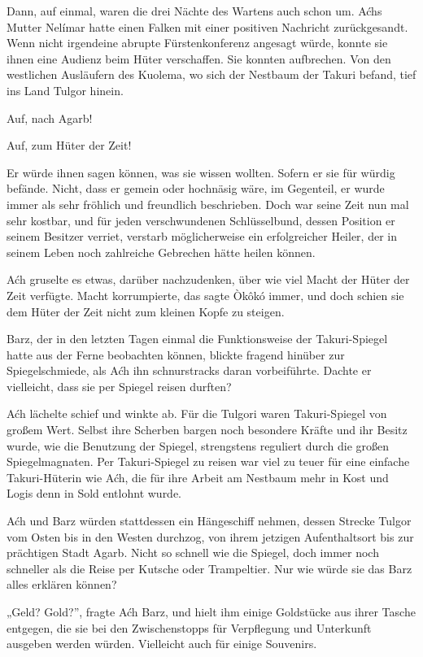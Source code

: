 \trennzeichen



Dann, auf einmal, waren die drei Nächte des Wartens auch schon um. Aćhs Mutter Nelímar hatte einen Falken mit einer positiven Nachricht zurückgesandt. Wenn nicht irgendeine abrupte Fürstenkonferenz angesagt würde, konnte sie ihnen eine Audienz beim Hüter verschaffen. Sie konnten aufbrechen. Von den westlichen Ausläufern des Kuolema, wo sich der Nestbaum der Takuri befand, tief ins Land Tulgor hinein.

Auf, nach Agarb!

Auf, zum Hüter der Zeit!

Er würde ihnen sagen können, was sie wissen wollten. Sofern er sie für würdig befände. Nicht, dass er gemein oder hochnäsig wäre, im Gegenteil, er wurde immer als sehr fröhlich und freundlich beschrieben. Doch war seine Zeit nun mal sehr kostbar, und für jeden verschwundenen Schlüsselbund, dessen Position er seinem Besitzer verriet, verstarb möglicherweise ein erfolgreicher Heiler, der in seinem Leben noch zahlreiche Gebrechen hätte heilen können.

Aćh gruselte es etwas, darüber nachzudenken, über wie viel Macht der Hüter der Zeit verfügte. Macht korrumpierte, das sagte Òkôkó immer, und doch schien sie dem Hüter der Zeit nicht zum kleinen Kopfe zu steigen.

Barz, der in den letzten Tagen einmal die Funktionsweise der Takuri-Spiegel hatte aus der Ferne beobachten können, blickte fragend hinüber zur Spiegelschmiede, als Aćh ihn schnurstracks daran vorbeiführte. Dachte er vielleicht, dass sie per Spiegel reisen durften?

Aćh lächelte schief und winkte ab. Für die Tulgori waren Takuri-Spiegel von großem Wert. Selbst ihre Scherben bargen noch besondere Kräfte und ihr Besitz wurde, wie die Benutzung der Spiegel, strengstens reguliert durch die großen Spiegelmagnaten. Per Takuri-Spiegel zu reisen war viel zu teuer für eine einfache Takuri-Hüterin wie Aćh, die für ihre Arbeit am Nestbaum mehr in Kost und Logis denn in Sold entlohnt wurde.

Aćh und Barz würden stattdessen ein Hängeschiff nehmen, dessen Strecke Tulgor vom Osten bis in den Westen durchzog, von ihrem jetzigen Aufenthaltsort bis zur prächtigen Stadt Agarb. Nicht so schnell wie die Spiegel, doch immer noch schneller als die Reise per Kutsche oder Trampeltier. Nur wie würde sie das Barz alles erklären können?

„Geld? Gold?”, fragte Aćh Barz, und hielt ihm einige Goldstücke aus ihrer Tasche entgegen, die sie bei den Zwischenstopps für Verpflegung und Unterkunft ausgeben werden würden. Vielleicht auch für einige Souvenirs.

